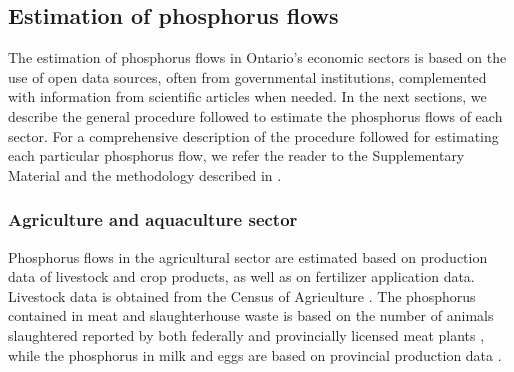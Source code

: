 \documentclass[]{elsarticle}
\begin{document}

\subsection{Estimation of phosphorus flows}
The estimation of phosphorus flows in Ontario's economic sectors is based on
the use of open data sources, often from governmental institutions, complemented with information from scientific articles when needed. In the next sections, we describe the general procedure followed to estimate the phosphorus flows of each sector. For a comprehensive description of the procedure followed for estimating each particular phosphorus flow, we refer the reader to the Supplementary Material and the methodology described in \citep{PFlows_Ontario}.

\subsubsection{Agriculture and aquaculture sector} \label{section:AgriSector}
Phosphorus flows in the agricultural sector are estimated based on production data of livestock and crop products, as well as on fertilizer application data. Livestock data is obtained from the Census of Agriculture \citep{CensusOfAgricultureCanada}. The phosphorus contained in meat and slaughterhouse waste is based on the number of animals
slaughtered reported by both federally and provincially licensed meat plants \citep{SlaughterFederalRedMeat, SlaughterFederalPoultry}, while the phosphorus in milk and eggs are based on provincial production data \citep{EggOntario,MilkOntario}.
\end{document}
